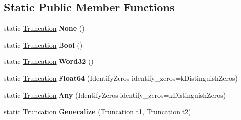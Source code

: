 \subsection*{Static Public Member Functions}
\begin{DoxyCompactItemize}
\item 
\mbox{\label{classv8_1_1internal_1_1compiler_1_1Truncation_a5e954b4eb6f20de540969d9cb27cbb95}} 
static \mbox{\hyperlink{classv8_1_1internal_1_1compiler_1_1Truncation}{Truncation}} {\bfseries None} ()
\item 
\mbox{\label{classv8_1_1internal_1_1compiler_1_1Truncation_ad61f87959f8ff937d743877b2bac0672}} 
static \mbox{\hyperlink{classv8_1_1internal_1_1compiler_1_1Truncation}{Truncation}} {\bfseries Bool} ()
\item 
\mbox{\label{classv8_1_1internal_1_1compiler_1_1Truncation_aaadebb94a94f514fc0d04b3e92acf0d8}} 
static \mbox{\hyperlink{classv8_1_1internal_1_1compiler_1_1Truncation}{Truncation}} {\bfseries Word32} ()
\item 
\mbox{\label{classv8_1_1internal_1_1compiler_1_1Truncation_a1aa01e3a4724e59e412f14c33645e3bc}} 
static \mbox{\hyperlink{classv8_1_1internal_1_1compiler_1_1Truncation}{Truncation}} {\bfseries Float64} (Identify\+Zeros identify\+\_\+zeros=k\+Distinguish\+Zeros)
\item 
\mbox{\label{classv8_1_1internal_1_1compiler_1_1Truncation_a2b5d95e75378c720cbe17f2813758adc}} 
static \mbox{\hyperlink{classv8_1_1internal_1_1compiler_1_1Truncation}{Truncation}} {\bfseries Any} (Identify\+Zeros identify\+\_\+zeros=k\+Distinguish\+Zeros)
\item 
\mbox{\label{classv8_1_1internal_1_1compiler_1_1Truncation_ab9ba28a6b072c6789c06d8f2b5df449f}} 
static \mbox{\hyperlink{classv8_1_1internal_1_1compiler_1_1Truncation}{Truncation}} {\bfseries Generalize} (\mbox{\hyperlink{classv8_1_1internal_1_1compiler_1_1Truncation}{Truncation}} t1, \mbox{\hyperlink{classv8_1_1internal_1_1compiler_1_1Truncation}{Truncation}} t2)
\end{DoxyCompactItemize}


